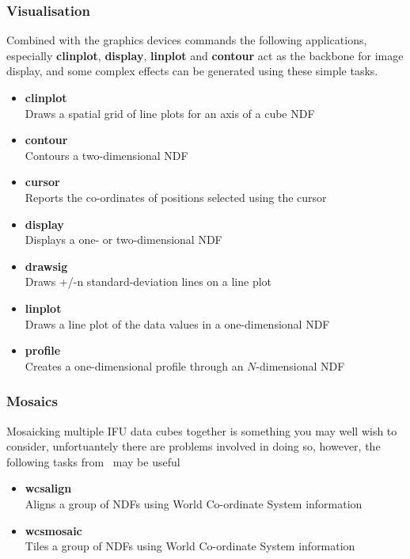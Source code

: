 \documentclass[twoside,11pt]{article}
\newcommand{\htmlref}[2]{#1}
\newcommand{\xref}[3]{#1}
\begin{document}
{\subsubsection{Visualisation}

Combined with the \htmlref{graphics devices commands}{sc16_graphics} the following applications, especially
{\bf clinplot}, {\bf display}, {\bf linplot} and {\bf contour} act as the backbone
for image display, and some complex effects can be generated using
these simple tasks.

\begin{itemize}
\item{\xref{{\bf clinplot}}{sun95}{CLINPLOT}}\\
Draws a spatial grid of line plots for an axis of a cube NDF  
\item{\xref{{\bf contour}}{sun95}{CONTOUR}}\\
Contours a two-dimensional NDF 
\item{\xref{{\bf cursor}}{sun95}{CURSOR}}\\
Reports the co-ordinates of positions selected using the cursor 
\item{\xref{{\bf display}}{sun95}{DISPLAY}}\\
Displays a one- or two-dimensional NDF 
\item{\xref{{\bf drawsig}}{sun95}{DRAWSIG}}\\
Draws +/-n standard-deviation lines on a line plot 
\item{\xref{{\bf linplot}}{sun95}{LINPLOT}}\\
Draws a line plot of the data values in a one-dimensional NDF 
\item{\xref{{\bf profile}}{sun95}{PROFILE}}\\
Creates a one-dimensional profile through an $N$-dimensional NDF 
\end{itemize}  

\subsubsection{Mosaics}

Mosaicking multiple IFU data cubes together is something you may well
wish to consider, unfortuantely there are \htmlref{problems}{sc16_mos}
involved in doing so, however,
the following tasks from \KAPPA\ may be useful

\begin{itemize}  
\item{\xref{{\bf wcsalign}}{sun95}{WCSALIGN}}\\
Aligns a group of NDFs using World Co-ordinate System information 
\item{\xref{{\bf wcsmosaic}}{sun95}{WCSMOSAIC}}\\
Tiles a group of NDFs using World Co-ordinate System information
\end{itemize}

}
\end{document}
